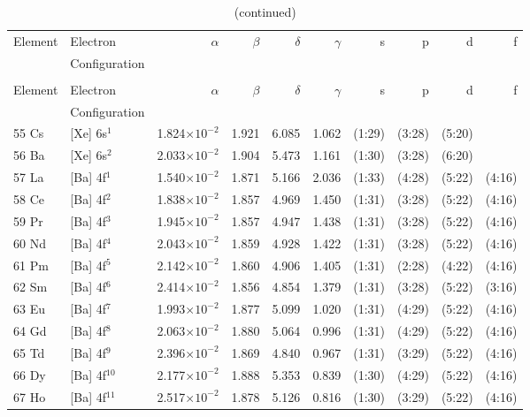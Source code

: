 \documentclass[12pt]{report}
\begin{document}
\begin{longtable}{l l r r r r r r r r}
\caption[Basis sets optimized using cudaDFRATOM]{Basis sets optimized using cudaDFRATOM}
\label{tab:BStab_rel} \\
\toprule
	Element	&	Electron		&	$\alpha$	&	$\beta$	&	$\delta$	&	$\gamma$	&	s	&	p	&	d	&	f	\\
			&	Configuration	&			&			&			&				&		&		&		&		\\
\midrule
\endfirsthead
\caption[]{(continued)}\\
\toprule
	Element	&	Electron		&	$\alpha$	&	$\beta$	&	$\delta$	&	$\gamma$	&	s	&	p	&	d	&	f	\\
			&	Configuration	&			&			&			&				&		&		&		&		\\
\midrule
\endhead
55 Cs		&	[Xe] 6s$^{1}$	&	1.824$\times10^{-2}$	&	1.921	&	6.085	&	1.062	&	(1:29)	&	 (3:28)	&	 (5:20)	\\
56 Ba		&	[Xe] 6s$^{2}$	&	2.033$\times10^{-2}$	&	1.904	&	5.473	&	1.161	&	(1:30)	&	 (3:28)	&	 (6:20)	\\
57 La		&	[Ba] 4f$^{1}$	&	1.540$\times10^{-2}$	&	1.871	&	5.166	&	2.036	&	(1:33)	&	 (4:28)	&	 (5:22)	&	 (4:16)\\
58 Ce		&	[Ba] 4f$^{2}$	&	1.838$\times10^{-2}$	&	1.857	&	4.969	&	1.450	&	(1:31)	&	 (3:28)	&	 (5:22)	&	 (4:16)\\
59 Pr		&	[Ba] 4f$^{3}$	&	1.945$\times10^{-2}$	&	1.857	&	4.947	&	1.438	&	(1:31)	&	 (3:28)	&	 (5:22)	&	 (4:16)\\
60 Nd		&	[Ba] 4f$^{4}$	&	2.043$\times10^{-2}$	&	1.859	&	4.928	&	1.422	&	(1:31)	&	 (3:28)	&	 (5:22)	&	 (4:16)\\
61 Pm		&	[Ba] 4f$^{5}$	&	2.142$\times10^{-2}$	&	1.860	&	4.906	&	1.405	&	(1:31)	&	 (2:28)	&	 (4:22)	&	 (4:16)\\
62 Sm		&	[Ba] 4f$^{6}$	&	2.414$\times10^{-2}$	&	1.856	&	4.854	&	1.379	&	(1:31)	&	 (3:28)	&	 (5:22)	&	 (3:16)\\
63 Eu		&	[Ba] 4f$^{7}$	&	1.993$\times10^{-2}$	&	1.877	&	5.099	&	1.020	&	(1:31)	&	 (4:29)	&	 (5:22)	&	 (4:16)\\
64 Gd		&	[Ba] 4f$^{8}$	&	2.063$\times10^{-2}$	&	1.880	&	5.064	&	0.996	&	(1:31)	&	 (4:29)	&	 (5:22)	&	 (4:16)\\
65 Td		&	[Ba] 4f$^{9}$	&	2.396$\times10^{-2}$	&	1.869	&	4.840	&	0.967	&	(1:31)	&	 (3:29)	&	 (5:22)	&	 (4:16)\\
66 Dy		&	[Ba] 4f$^{10}$	&	2.177$\times10^{-2}$	&	1.888	&	5.353	&	0.839	&	(1:30)	&	 (4:29)	&	 (5:22)	&	 (4:16)\\
67 Ho		&	[Ba] 4f$^{11}$	&	2.517$\times10^{-2}$	&	1.878	&	5.126	&	0.816	&	(1:30)	&	 (3:29)	&	 (5:22)	&	 (4:16)\\

\end{longtable}
\end{document}
